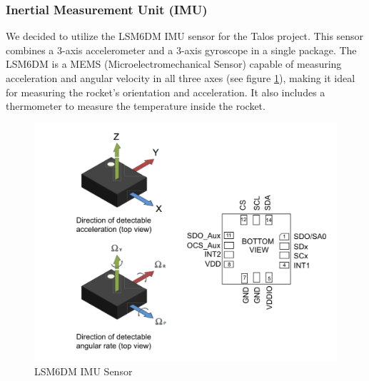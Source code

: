 \documentclass{article}
\begin{document}
\subsubsection*{Inertial Measurement Unit (IMU)}
We decided to utilize the LSM6DM IMU sensor for the Talos project. This sensor combines a 3-axis accelerometer and a 3-axis gyroscope in a single package. The LSM6DM is a MEMS (Microelectromechanical Sensor) capable of measuring acceleration and angular velocity in all three axes (see figure \ref{fig:lsm6dm}), making it ideal for measuring the rocket's orientation and acceleration. It also includes a thermometer to measure the temperature inside the rocket.
\begin{figure}[p]
      \caption{LSM6DM IMU Sensor\cite{LSM6DSM}}
      \label{fig:lsm6dm}
      \centering
      \includegraphics[width=\textwidth]{ldsm6m.png}
\end{figure}
\end{document}
